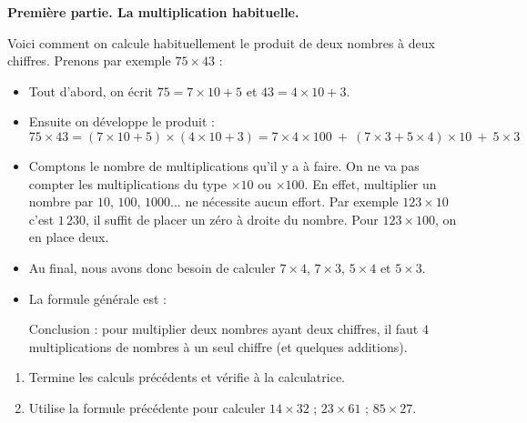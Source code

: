 \documentclass[class=report,crop=false, 12pt]{standalone}
\begin{document}
\begin{activite}

\textbf{Première partie. La multiplication habituelle.}

Voici comment on calcule habituellement le produit de deux nombres à deux chiffres. Prenons par exemple $75 \times 43$ :
\begin{itemize}
  \item Tout d'abord, on écrit $75 = 7 \times 10 + 5$ et $43 = 4 \times 10 + 3$.
  
  \item Ensuite on développe le produit :
  $$75 \times 43 
  = (7 \times 10 + 5) \times (4 \times 10 + 3)
  = 7 \times 4 \times 100 \  + \  (7 \times 3 + 5 \times 4)\times 10 \ + \ 5 \times 3$$

  \item Comptons le nombre de multiplications qu'il y a à faire.
  On ne va pas compter les multiplications du type $\times 10$ ou $\times 100$.
  En effet, multiplier un nombre par $10$, $100$, $1000$...  ne nécessite aucun effort.
  Par exemple $123\times 10$ c'est $1\,230$, il suffit de placer un zéro à droite du nombre.
  Pour $123 \times 100$, on en place deux.
  
  \item Au final, nous avons donc besoin de calculer $7 \times 4$, $7 \times 3$, $5 \times 4$ et $5 \times 3$. 
  
  \item La formule générale est :
  
  Conclusion : pour multiplier deux nombres ayant deux chiffres, il faut $4$ multiplications de nombres à un seul chiffre (et quelques additions).
\end{itemize}

\begin{enumerate} 
  \item Termine les calculs précédents et vérifie à la calculatrice.
  
  \item Utilise la formule précédente pour calculer $14 \times 32$ ; $23 \times 61$ ; $85 \times 27$.
  

\end{enumerate}
\end{activite}
\end{document}
